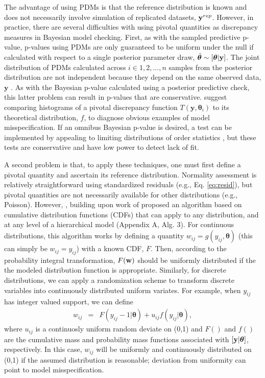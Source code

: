 \documentclass[12pt,english]{article}
\begin{document}
\begin{spacing}{1.9}
The advantage of using PDMs is that the reference distribution is known and does not necessarily involve simulation of replicated datasets, ${\bf y}^{rep}$.  However, in practice, there are several difficulties with using pivotal quantities as discrepancy measures in Bayesian model checking.  First, as with the sampled predictive p-value, p-values using PDMs are only guaranteed to be uniform under the null if calculated with respect to a single posterior parameter draw, $\tilde{\boldsymbol{\theta}} \sim [\boldsymbol{\theta} | {\bf y}]$.  The joint distribution of PDMs calculated across $i \in 1,2,\hdots,n$ samples from the posterior distribution are not independent because they depend on the same observed data, $\textbf{y}$ \citep{Johnson2004}.  As with the Bayesian p-value calculated using a posterior predictive check, this latter problem can result in p-values that are conservative.  \citet{YuanJohnson2012} suggest comparing histograms of a pivotal discrepancy function $T(\textbf{y},\boldsymbol{\theta}_i)$ to its theoretical distribution, $f$, to diagnose obvious examples of model misspecification.  If an omnibus Bayesian p-value is desired, a test can be implemented by appealing to limiting distributions of order statistics \citep{Johnson2004}, but these tests are conservative and have low power to detect lack of fit.

A second problem is that, to apply these techniques, one must first define a pivotal quantity and ascertain its reference distribution. Normality assessment is relatively straightforward using standardized residuals (e.g., Eq. \ref{eq:resid}), but pivotal quantities are not necessarily available for other distributions (e.g., Poisson).  However, \citet{YuanJohnson2012}, building upon work of \citet{Johnson2004} proposed an algorithm based on cumulative distribution functions (CDFs) that can apply to any distribution, and at any level of a hierarchical model (Appendix A, Alg. 3).  For continuous distributions, this algorithm works by defining a quantity $w_{ij} = g(y_{ij},\boldsymbol{\theta})$ (this can simply be $w_{ij}=y_{ij}$) with a known CDF, $F$.  Then, according to the probability integral transformation, $F({\bf w})$ should be uniformly distributed if the the modeled distribution function is appropriate.  Similarly, for discrete distributions, we can apply a randomization scheme \citep{Smith1985,YuanJohnson2012} to transform discrete variables into continuously distributed uniform variates.  For example, when $y_{ij}$ has integer valued support, we can define
\begin{eqnarray*}
  w_{ij} & = & F(y_{ij}-1|\boldsymbol{\theta}) + u_{ij} f(y_{ij}|\boldsymbol{\theta}),
\end{eqnarray*}
where $u_{ij}$ is a continuosly uniform random deviate on (0,1) and $F()$ and $f()$ are the cumulative mass and probability mass functions associated with $[{\bf y} | \boldsymbol{\theta}]$, respectively.  In this case, $w_{ij}$ will be uniformly and continuously distributed on (0,1) if the assumed distribution is reasonable; deviation from uniformity can point to model misspecification.


\end{spacing}
\end{document}
